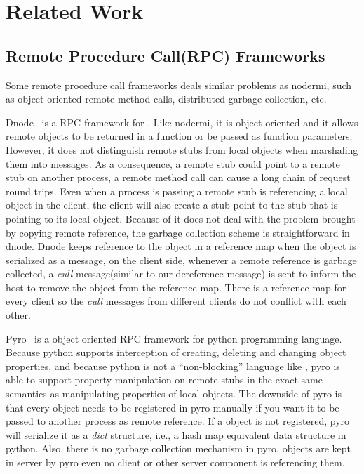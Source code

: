 \chapter{Related Work}

\section{Remote Procedure Call(RPC) Frameworks}
Some remote procedure call frameworks deals similar problems as nodermi,
such as object oriented remote method calls,
distributed garbage collection, etc.

Dnode~\cite{dnode} is a RPC framework for \nodejs{}. 
Like nodermi, it is object oriented and it allows remote objects to be 
returned in a function or be passed as function parameters.
However, it does not distinguish remote stubs from local objects 
when marshaling them into messages.
As a consequence, a remote stub could point to a remote stub on another process,
a remote method call can cause a long chain of request round trips.
Even when a process is passing a remote stub is referencing a local object in the client,
the client will also create a stub point to the stub that is pointing to its local object.
Because of it does not deal with the problem brought by copying remote reference,
the garbage collection scheme is straightforward in dnode.
Dnode keeps reference to the object in a reference map when the object
 is serialized as a message,
on the client side,
whenever a remote reference is garbage collected, 
a \emph{cull} message(similar to our dereference message) 
is sent to inform the host to remove the object from 
the reference map.
There is a reference map for every client so the \emph{cull} messages from
different clients do not conflict with each other.
 
Pyro~\cite{pyro} is a object oriented RPC framework for python programming language.
Because python supports interception of creating, deleting and changing object properties,
and because python is not a ``non-blocking'' language like \js{},
pyro is able to support property manipulation on remote stubs in the exact same semantics as manipulating 
properties of local objects.
The downside of pyro is that every object needs to be registered in pyro manually
if you want it to be passed to another process as remote reference.
If a object is not registered,
pyro will serialize it as a \emph{dict} structure, i.e., a hash map equivalent data structure in python.
Also, there is no garbage collection mechanism in pyro, 
objects are kept in server by pyro even no client or other server component is referencing them.

